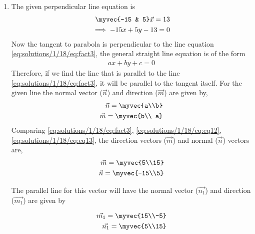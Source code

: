 \begin{enumerate}
	\item
						The given perpendicular line equation is
	\begin{align} 
		\myvec{-15 & 5}\vec{x}= 13 \\
		\implies -15x + 5y - 13 = 0 \label{eq:solutions/1/18/eq:fact3}
	\end{align}
	Now the tangent to parabola is perpendicular to the line equation \eqref{eq:solutions/1/18/eq:fact3}, the general straight line equation is of the form
	\begin{align}
		ax + by + c = 0
	\end{align}
	Therefore, if we find the line that is parallel to the line \eqref{eq:solutions/1/18/eq:fact3}, it will be parallel to the tangent itself. For the given line the normal vector ($\vec{n}$) and direction ($\vec{m}$) are given by,
	\begin{align} 
		\vec{n} = \myvec{a\\b} \label{eq:solutions/1/18/eq:eq12}\\
		\vec{m} = \myvec{b\\-a} \label{eq:solutions/1/18/eq:eq13}
	\end{align}
	Comparing \eqref{eq:solutions/1/18/eq:fact3}, \eqref{eq:solutions/1/18/eq:eq12}, \eqref{eq:solutions/1/18/eq:eq13}, the direction vectors ($\vec{m}$) and normal ($\vec{n}$)  vectors are,
	\begin{align}
		\vec{m} = \myvec{5\\15}\\
		\vec{n} = \myvec{-15\\5}\label{eq:solutions/1/18/eq:eq14}
	\end{align} 

	The parallel line for this vector will have the normal vector ($\vec{n_1}$) and direction ($\vec{m_1}$) are given by
	
		\begin{align}
		\vec{m_1} = \myvec{15\\-5}\\
		\vec{n_1} = \myvec{5\\15}\label{eq:solutions/1/18/eq:eq15}
	\end{align} 
	

\end{enumerate}
